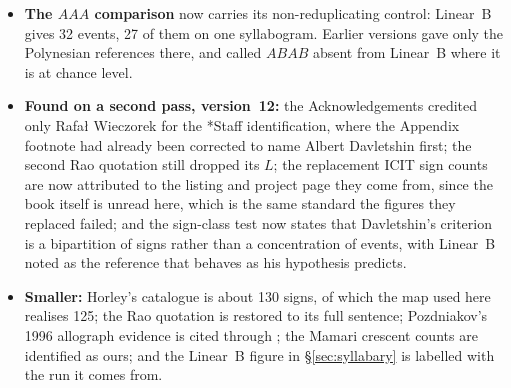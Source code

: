 \documentclass[11pt,a4paper]{article}
\begin{document}
\begin{itemize}
motivated by the catalogues differing mainly in the tail. An earlier version
attributed the description of the field behind it to E.~Korovina, who did not make it.
Her partial precedent, one method run on two transliterations, is now disclosed in the
abstract as well as in the introduction.
\item \textbf{The $AAA$ comparison} now carries its non-reduplicating control:
Linear~B gives 32 events, 27 of them on one syllabogram. Earlier versions gave only
the Polynesian references there, and called $ABAB$ absent from Linear~B where it is at
chance level.
\item \textbf{Found on a second pass, version~12:} the Acknowledgements credited only
Rafa\l{} Wieczorek for the *Staff identification, where the Appendix footnote had already
been corrected to name Albert Davletshin first; the second Rao quotation still dropped its
$L$; the replacement ICIT sign counts are now attributed to the listing and project page
they come from, since the book itself is unread here, which is the same standard the
figures they replaced failed; and the sign-class test now states that Davletshin's
criterion is a bipartition of signs rather than a concentration of events, with Linear~B
noted as the reference that behaves as his hypothesis predicts.
\item \textbf{Smaller:} Horley's catalogue is about 130 signs, of which the map used
here realises 125; the Rao quotation is restored to its full sentence; Pozdniakov's
1996 allograph evidence is cited through \citet{pozdniakov2007}; the Mamari crescent
counts are identified as ours; and the Linear~B figure in \S\ref{sec:syllabary} is
labelled with the run it comes from.
\end{itemize}
\end{document}
